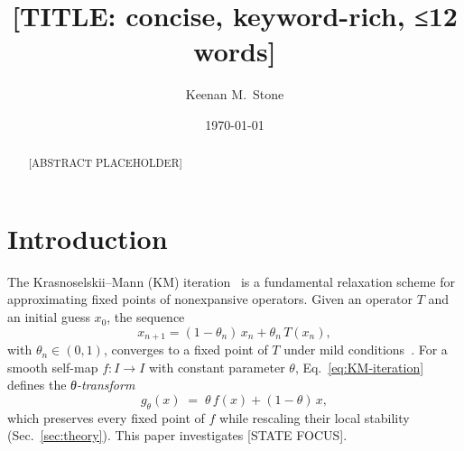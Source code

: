 \documentclass[aps,pre,twocolumn,superscriptaddress,nofootinbib,longbibliography]{revtex4-2}
\newcommand{\param}{\theta}                        %
\newcommand{\KMdef}{%
  g_{\param}(x) \;=\; \param\,f(x) + (1-\param)\,x}
\newcommand{\KM}{Krasnoselskii--Mann}              %
\theoremstyle{plain}
\theoremstyle{definition}
\theoremstyle{remark}
\begin{document}

\title{[TITLE: concise, keyword-rich, ≤12 words]}

\author{Keenan M.~Stone}
\affiliation{[AFFILIATION]}
\email{[EMAIL]}


\date{\today}

\begin{abstract}
%
[ABSTRACT PLACEHOLDER]
\end{abstract}


\maketitle

\section{Introduction}
\label{sec:intro}


The \KM{} (KM) iteration~\cite{Krasnoselskii1955,Mann1953} is a
fundamental relaxation scheme for approximating fixed points of
nonexpansive operators.  Given an operator $T$ and an initial
guess $x_0$, the sequence
%
\begin{equation}
  x_{n+1} = (1-\param_n)\,x_n + \param_n\,T(x_n),
  \label{eq:KM-iteration}
\end{equation}
%
with $\param_n \in (0,1)$, converges to a fixed point of $T$
under mild conditions~\cite{Berinde2007}.  For a smooth
self-map $f : I \to I$ with constant parameter $\param$,
Eq.~\eqref{eq:KM-iteration} defines the \emph{θ-transform}
%
\begin{equation}
  \KMdef,
  \label{eq:theta-transform}
\end{equation}
%
which preserves every fixed point of $f$ while rescaling their
local stability (Sec.~\ref{sec:theory}).
This paper investigates [STATE FOCUS].
\end{document}
